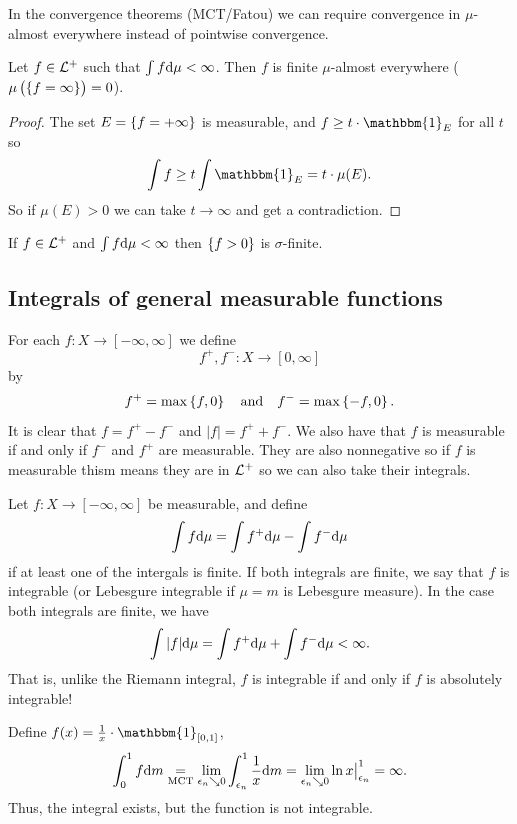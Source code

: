 \documentclass[11pt,a4paper]{article}
\begin{document}
\begin{corollary}
  In the convergence theorems (MCT/Fatou) we can require convergence in
  $\mu$-almost everywhere instead of pointwise convergence.
\end{corollary}

\begin{proposition}
  Let $f \in \mathcal{L}^+$ such that $\int f \mathrm{d} \mu < \infty$.
  Then $f$ is finite $\mu$-almost everywhere ($\mu\del{\set{f = \infty}} = 0$).
\end{proposition}
\begin{proof}
  The set $E = \left\{f = + \infty\right\}$ is measurable,
  and $f \geq t \cdot \mathbbm{1}_{E}$ for all $t$ so
  \[
    \int f \geq t \int \mathbbm{1}_{E} = t \cdot \mu(E).
  \]
  So if $\mu(E) > 0$ we can take $t \to \infty$ and get a contradiction.
\end{proof}
\begin{exercise}
  If $f \in \mathcal{L}^+$ and $\int f \mathrm{d} \mu < \infty$ then $\left\{f > 0\right\}$ is
  $\sigma$-finite.
\end{exercise}

\subsection{Integrals of general measurable functions}
For each $f \colon X \to [-\infty, \infty]$ we define
\[
  f^+, f^- \colon X \to [0,\infty]
\]
by
\[
  f^+ = \max\left\{f, 0\right\} \quad \text{and} \quad
  f^- = \max\left\{-f, 0\right\}.
\]
It is clear that $f = f^+ - f^-$ and $|f| = f^+ + f^-$.
We also have that $f$ is measurable if and only if $f^-$ and $f^+$
are measurable. They are also nonnegative so if $f$ is measurable thism means
they are in $\mathcal{L}^+$ so we can also take their integrals.
\begin{definition}[Integrability]
  Let $f \colon X \to [-\infty, \infty]$ be measurable, and define
  \[
    \int f \mathrm{d} \mu =
    \int f^+ \mathrm{d} \mu - \int f^- \mathrm{d} \mu
  \]
  if at least one of the intergals is finite.
  If both integrals are finite, we say that $f$ is integrable (or Lebesgure
  integrable if $\mu = m$ is Lebesgure measure).
  In the case both integrals are finite, we have
  \[
    \int |f| \mathrm{d} \mu =
    \int f^+ \mathrm{d} \mu + \int f^- \mathrm{d} \mu < \infty.
  \]
  That is, unlike the Riemann integral,
  $f$ is integrable if and only if $f$ is absolutely integrable!
\end{definition}
\begin{example}
  Define $f(x) = \frac{1}{x} \cdot \mathbbm{1}_{[0,1]}$,
  \[
    \int_{0}^{1} f \mathrm{d} m \underset{\text{MCT}}{=}
    \lim_{\epsilon_n \searrow 0} \int_{\epsilon_n}^{1} \frac{1}{x} \mathrm{d} m =
    \lim_{\epsilon_n \searrow 0} \ln x \big\vert_{\epsilon_n}^{1} = \infty.
  \]
  Thus, the integral exists,
  but the function is not integrable.
\end{example}
\end{document}
